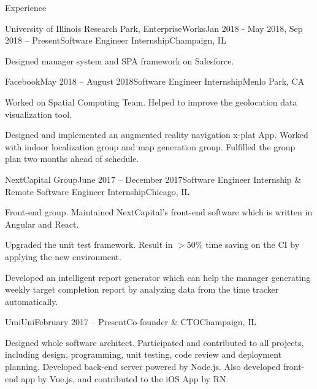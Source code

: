 \documentclass{resume} %
\begin{document}
\begin{rSection}{Experience}

\begin{rSubsection}{University of Illinois Research Park, EnterpriseWorks}{Jan 2018 - May 2018, Sep 2018 -- Present}{Software Engineer Internship}{Champaign, IL}
\item Designed manager system and SPA framework on Salesforce.
\end{rSubsection}

\begin{rSubsection}{Facebook}{May 2018 -- August 2018}{Software Engineer Internship}{Menlo Park, CA}
\item Worked on Spatial Computing Team. Helped to improve the geolocation data visualization tool.
\item Designed and implemented an augmented reality navigation x-plat App. Worked with indoor localization group and map generation group. Fulfilled the group plan two months ahead of schedule.
\end{rSubsection}

\begin{rSubsection}{NextCapital Group}{June 2017 -- December 2017}{Software Engineer Internship \& Remote Software Engineer Internship}{Chicago, IL}

\item Front-end group. Maintained NextCapital's front-end software which is written in Angular and React.
\item Upgraded the unit test framework. Result in $>50\%$ time saving on the CI by applying the new environment.
\item Developed an intelligent report generator which can help the manager generating weekly target completion report by analyzing data from the time tracker automatically.

\end{rSubsection}

\begin{rSubsection}{UmiUni}{February 2017 -- Present}{Co-founder \& CTO}{Champaign, IL}

\item Designed whole software architect. Participated and contributed to all projects, including design, programming, unit testing, code review and deployment planning. Developed back-end server powered by Node.js. Also developed front-end app by Vue.js, and contributed to the iOS App by RN.

\end{rSubsection}


\end{rSection}
\end{document}
